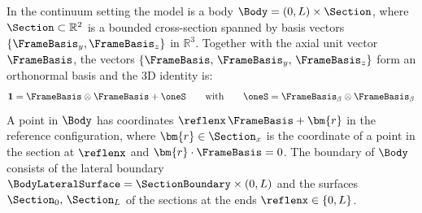 In the continuum setting the model is a body
\(
\Body=(0,L)\times\Section
\),
where \(\Section\subset\mathbb{R}^2\) is a bounded cross-section
spanned by basis vectors \(\{\FrameBasis_y,\FrameBasis_z\}\) in \(\mathbb{R}^3\). 
Together with the axial unit vector \(\FrameBasis\), the vectors \(\{\FrameBasis,\,\FrameBasis_y,\,\FrameBasis_z\}\) form an orthonormal basis and the 3D identity is:
\[
\mathbf{1}=\FrameBasis\otimes\FrameBasis+\oneS
\qquad\text{with}\qquad
\oneS=\FrameBasis_{\beta}\otimes\FrameBasis_{\beta}
\]
A point in \(\Body\) has coordinates \(\reflenx\,\FrameBasis + \bm{r}\) in the reference configuration, where \(\bm{r} \in\Section_x\) is the coordinate of a point in the section at \(\reflenx\) and \(\bm{r}\cdot\FrameBasis = 0\).
The boundary of \(\Body\) consists of the lateral boundary \(\BodyLateralSurface=\SectionBoundary\times(0,L)\) and the surfaces \(\Section_0,\,\Section_L\) of the sections at the ends \(\reflenx \in \{0,L\}\).  

